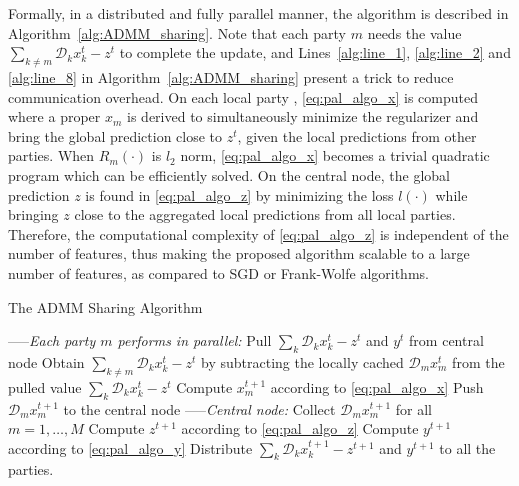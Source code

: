 Formally, in a distributed and fully parallel manner, the algorithm is described in Algorithm~\ref{alg:ADMM_sharing}. Note that each party $m$ needs the value $\sum_{k\neq m}\mathcal{D}_kx_k^{t} - z^{t}$ to complete the update, and Lines~\ref{alg:line_1}, \ref{alg:line_2} and \ref{alg:line_8} in Algorithm~\ref{alg:ADMM_sharing} present a trick to reduce communication overhead. On each local party , \eqref{eq:pal_algo_x} is computed where a proper $x_m$ is derived to simultaneously minimize the regularizer and bring the global prediction close to $z^t$, given the local predictions from other parties. When $R_m(\cdot)$ is $l_2$ norm, \eqref{eq:pal_algo_x} becomes a trivial quadratic program which can be efficiently solved. On the central node, the global prediction $z$ is found in \eqref{eq:pal_algo_z} by minimizing the loss $l(\cdot)$ while bringing $z$ close to the aggregated local predictions from all local parties. Therefore, the computational complexity of \eqref{eq:pal_algo_z} is independent of the number of features, thus making the proposed algorithm scalable to a large number of features, as compared to SGD or Frank-Wolfe algorithms. %

\begin{algorithm}[t]
\caption{The ADMM Sharing Algorithm}
\begin{algorithmic}[1]
    \STATE -----\emph{Each party $m$ performs in parallel:}
        \STATE Pull  $\sum_k\mathcal{D}_kx_k^{t} - z^{t}$  and $y^{t}$ from central node \label{alg:line_1}
        \STATE Obtain $\sum_{k\neq m}\mathcal{D}_kx_k^{t} - z^{t}$ by subtracting the locally cached $\mathcal{D}_mx_m^{t}$ from  the pulled value $\sum_k\mathcal{D}_kx_k^{t} - z^{t}$ \label{alg:line_2}
        \STATE Compute $x_m^{t+1}$ according to \eqref{eq:pal_algo_x} \label{alg:line_3}
        \STATE Push $\mathcal{D}_mx_m^{t+1}$ to the central node \label{alg:line_4}
    \ENDFOR
    \STATE -----\emph{Central node:}
        \STATE Collect $\mathcal{D}_mx_m^{t+1}$ for all $m=1,\ldots,M$\label{alg:line_5}
        \STATE Compute $z^{t+1}$ according to \eqref{eq:pal_algo_z}\label{alg:line_6}
        \STATE Compute $y^{t+1}$ according to \eqref{eq:pal_algo_y}\label{alg:line_7}
        \STATE Distribute $\sum_k\mathcal{D}_kx_k^{t+1} - z^{t+1}$  and $y^{t+1}$ to all the parties. \label{alg:line_8}
    \ENDFOR
\end{algorithmic}
\label{alg:ADMM_sharing}
\end{algorithm}

